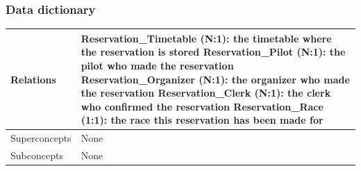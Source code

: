 \documentclass{beamer}
\begin{document}
\begin{frame}
\frametitle{Data dictionary}
\begin{table}
\tiny
\begin{tabular}{|p{2cm}|p{6cm}|}
\hline
Relations &
Reservation\_Timetable (N:1): the timetable where the reservation is stored \newline
Reservation\_Pilot (N:1): the pilot who made the reservation \newline
Reservation\_Organizer (N:1): the organizer who made the reservation \newline
Reservation\_Clerk (N:1): the clerk who confirmed the reservation \newline
Reservation\_Race (1:1): the race this reservation has been made for \\
\hline
Superconcepts & None \\
\hline
Subconcepts & None \\
\hline
\end{tabular}
\end{table}
\end{frame}
\end{document}
